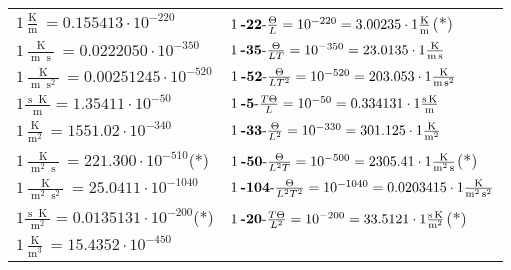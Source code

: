 \begin{center}
\begin{longtable}{l l}
{\color{black}$1 \bm{\mathrm{ }}\frac{\operatorname{K}}{\operatorname{m}} = 0.155413\cdot10^{-220} $}&
	{\color{black}$1\:\text{\textbf{-22}-} \frac{\Theta}{L}=10^{-220} = 3.00235 \cdot 1 \bm{\mathrm{ }}\frac{\operatorname{K}}{\operatorname{m}}$}\quad(*)\\
{\color{black}$1 \bm{\mathrm{ }}\frac{\operatorname{K}}{\operatorname{m}\operatorname{s}} = 0.0222050\cdot10^{-350} $}&
	{\color{black}$1\:\text{\textbf{-35}-} \frac{\Theta}{LT}=10^{-350} = 23.0135 \cdot 1 \bm{\mathrm{ }}\frac{\operatorname{K}}{\operatorname{m}\operatorname{s}}$}\\
{\color{black}$1 \bm{\mathrm{ }}\frac{\operatorname{K}}{\operatorname{m}\operatorname{s}^2} = 0.00251245\cdot10^{-520} $}&
	{\color{black}$1\:\text{\textbf{-52}-} \frac{\Theta}{LT^2}=10^{-520} = 203.053 \cdot 1 \bm{\mathrm{ }}\frac{\operatorname{K}}{\operatorname{m}\operatorname{s}^2}$}\\
{\color{black}$1 \bm{\mathrm{ }}\frac{\operatorname{s}\operatorname{K}}{\operatorname{m}} = 1.35411\cdot10^{-50} $}&
	{\color{black}$1\:\text{\textbf{-5}-} \frac{T\Theta}{L}=10^{-50} = 0.334131 \cdot 1 \bm{\mathrm{ }}\frac{\operatorname{s}\operatorname{K}}{\operatorname{m}}$}\\
{\color{black}$1 \bm{\mathrm{ }}\frac{\operatorname{K}}{\operatorname{m}^2} = 1551.02\cdot10^{-340} $}&
	{\color{black}$1\:\text{\textbf{-33}-} \frac{\Theta}{L^2}=10^{-330} = 301.125 \cdot 1 \bm{\mathrm{ }}\frac{\operatorname{K}}{\operatorname{m}^2}$}\\
{\color{black}$1 \bm{\mathrm{ }}\frac{\operatorname{K}}{\operatorname{m}^2\operatorname{s}} = 221.300\cdot10^{-510} $}\quad(*)&
	{\color{black}$1\:\text{\textbf{-50}-} \frac{\Theta}{L^2T}=10^{-500} = 2305.41 \cdot 1 \bm{\mathrm{ }}\frac{\operatorname{K}}{\operatorname{m}^2\operatorname{s}}$}\quad(*)\\
{\color{black}$1 \bm{\mathrm{ }}\frac{\operatorname{K}}{\operatorname{m}^2\operatorname{s}^2} = 25.0411\cdot10^{-1040} $}&
	{\color{black}$1\:\text{\textbf{-104}-} \frac{\Theta}{L^2T^2}=10^{-1040} = 0.0203415 \cdot 1 \bm{\mathrm{ }}\frac{\operatorname{K}}{\operatorname{m}^2\operatorname{s}^2}$}\\
{\color{black}$1 \bm{\mathrm{ }}\frac{\operatorname{s}\operatorname{K}}{\operatorname{m}^2} = 0.0135131\cdot10^{-200} $}\quad(*)&
	{\color{black}$1\:\text{\textbf{-20}-} \frac{T\Theta}{L^2}=10^{-200} = 33.5121 \cdot 1 \bm{\mathrm{ }}\frac{\operatorname{s}\operatorname{K}}{\operatorname{m}^2}$}\quad(*)\\
{\color{black}$1 \bm{\mathrm{ }}\frac{\operatorname{K}}{\operatorname{m}^3} = 15.4352\cdot10^{-450} $}&

\end{longtable}
\end{center}
